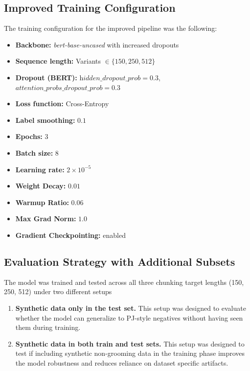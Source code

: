 \subsection{Improved Training Configuration}

The training configuration for the improved pipeline was the following:

\begin{itemize}
  \item \textbf{Backbone:} \textit{bert-base-uncased} with increased dropouts
  \item \textbf{Sequence length:} Variants \(\in \{150, 250, 512\}\) 
  \item \textbf{Dropout (BERT):} \(\textit{hidden\_dropout\_prob}=0.3\), \(\textit{attention\_probs\_dropout\_prob}=0.3\)
  \item \textbf{Loss function:} Cross-Entropy 
  \item \textbf{Label smoothing:} \(0.1\) 
  \item \textbf{Epochs:} \(3\)
  \item \textbf{Batch size:} \(8\)
  \item \textbf{Learning rate:} \(2\times10^{-5}\)
  \item \textbf{Weight Decay:} \(0.01\)
  \item \textbf{Warmup Ratio:} \(0.06\)
  \item \textbf{Max Grad Norm:} \(1.0\)
  \item \textbf{Gradient Checkpointing:} enabled 
\end{itemize}


\subsection{Evaluation Strategy with Additional Subsets}

The model was trained and tested across all three chunking target lengths (150, 250, 512) under two different setups
\begin{enumerate}
\item \textbf{Synthetic data only in the test set.}
This setup was designed to evaluate whether the model can generalize to PJ-style negatives without having seen them during training.
\item \textbf{Synthetic data in both train and test sets.}
This setup was designed to test if including synthetic non-grooming data in the training phase improves the model robustness and reduces reliance on dataset specific artifacts.
\end{enumerate}

